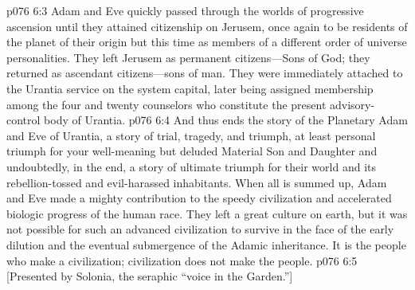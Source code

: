 \pc \vs p076 6:3 Adam and Eve quickly passed through the worlds of progressive ascension until they attained citizenship on Jerusem, once again to be residents of the planet of their origin but this time as members of a different order of universe personalities. They left Jerusem as permanent citizens---Sons of God; they returned as ascendant citizens---sons of man. They were immediately attached to the Urantia service on the system capital, later being assigned membership among the four and twenty counselors who constitute the present advisory\hyp{}control body of Urantia.
\pc \vs p076 6:4 And thus ends the story of the Planetary Adam and Eve of Urantia, a story of trial, tragedy, and triumph, at least personal triumph for your well\hyp{}meaning but deluded Material Son and Daughter and undoubtedly, in the end, a story of ultimate triumph for their world and its rebellion\hyp{}tossed and evil\hyp{}harassed inhabitants. When all is summed up, Adam and Eve made a mighty contribution to the speedy civilization and accelerated biologic progress of the human race. They left a great culture on earth, but it was not possible for such an advanced civilization to survive in the face of the early dilution and the eventual submergence of the Adamic inheritance. It is the people who make a civilization; civilization does not make the people.
\vsetoff
\vs p076 6:5 [Presented by Solonia, the seraphic “voice in the Garden.”]
